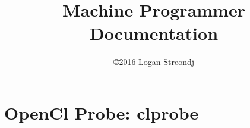 \documentclass[12pt]{report}
\title{Machine Programmer Documentation}
\author{\copyright 2016 Logan Streondj}%
\begin{document}
\maketitle
\tableofcontents


\chapter{OpenCl Probe: clprobe}

%
\end{document}
